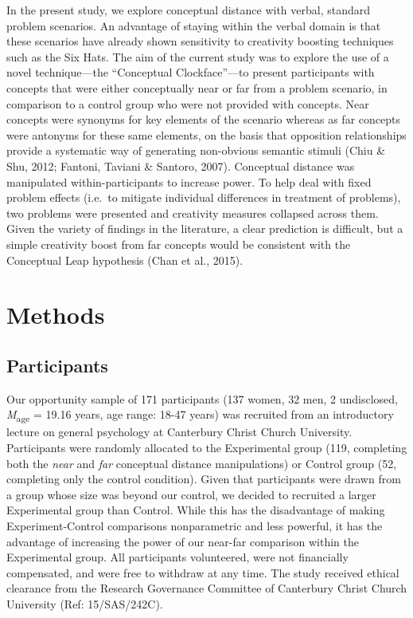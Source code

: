 \documentclass[english,man]{apa6}
\begin{document}
In the present study, we explore conceptual distance with verbal,
standard problem scenarios. An advantage of staying within the verbal
domain is that these scenarios have already shown sensitivity to
creativity boosting techniques such as the Six Hats. The aim of the
current study was to explore the use of a novel technique---the
\enquote{Conceptual Clockface}---to present participants with concepts
that were either conceptually near or far from a problem scenario, in
comparison to a control group who were not provided with concepts. Near
concepts were synonyms for key elements of the scenario whereas as far
concepts were antonyms for these same elements, on the basis that
opposition relationships provide a systematic way of generating
non-obvious semantic stimuli (Chiu \& Shu, 2012; Fantoni, Taviani \&
Santoro, 2007). Conceptual distance was manipulated within-participants
to increase power. To help deal with fixed problem effects (i.e.~to
mitigate individual differences in treatment of problems), two problems
were presented and creativity measures collapsed across them. Given the
variety of findings in the literature, a clear prediction is difficult,
but a simple creativity boost from far concepts would be consistent with
the Conceptual Leap hypothesis (Chan et al., 2015).

\hypertarget{methods}{%
\section{Methods}\label{methods}}

\hypertarget{participants}{%
\subsection{Participants}\label{participants}}

Our opportunity sample of 171 participants (137 women, 32 men, 2
undisclosed, \emph{M}\textsubscript{age} = 19.16 years, age range: 18-47
years) was recruited from an introductory lecture on general psychology
at Canterbury Christ Church University. Participants were randomly
allocated to the Experimental group (119, completing both the
\emph{near} and \emph{far} conceptual distance manipulations) or Control
group (52, completing only the control condition). Given that
participants were drawn from a group whose size was beyond our control,
we decided to recruited a larger Experimental group than Control. While
this has the disadvantage of making Experiment-Control comparisons
nonparametric and less powerful, it has the advantage of increasing the
power of our near-far comparison within the Experimental group. All
participants volunteered, were not financially compensated, and were
free to withdraw at any time. The study received ethical clearance from
the Research Governance Committee of Canterbury Christ Church University
(Ref: 15/SAS/242C).
\end{document}

